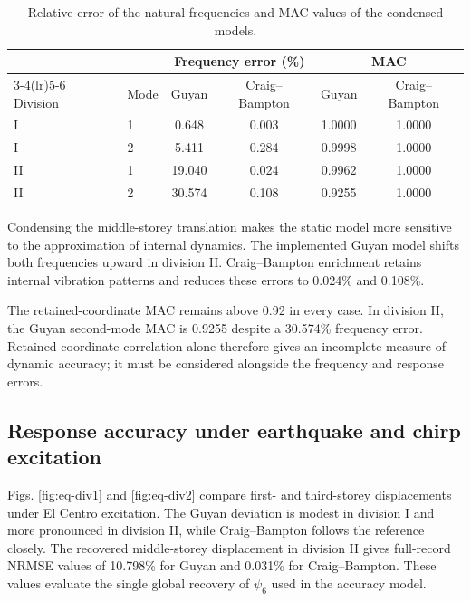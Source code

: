 \documentclass[a4paper,fleqn,review,12pt]{cas-sc}
\numberwithin{equation}{section}
\newcommand{\rev}[1]{{\color{red}#1}}
\begin{document}
\begin{table}[htbp]
	\centering
	\caption{Relative error of the natural frequencies and MAC values of the condensed models.}
	\label{tab:modal}
	\begin{tabular}{llcccc}
		\toprule
		& & \multicolumn{2}{c}{Frequency error (\%)} & \multicolumn{2}{c}{MAC}\\
		\cmidrule(lr){3-4}\cmidrule(lr){5-6}
		Division & Mode & Guyan & Craig--Bampton & Guyan & Craig--Bampton\\
		\midrule
		I  & 1 & 0.648& 0.003& 1.0000& 1.0000\\
		I  & 2 & 5.411& 0.284& 0.9998& 1.0000\\
		\midrule
		II & 1 & \rev{19.040}& \rev{0.024}& 0.9962& 1.0000\\
		II & 2 & \rev{30.574}& \rev{0.108}& 0.9255& \rev{1.0000}\\
		\bottomrule
	\end{tabular}
\end{table}

\rev{Condensing the middle-storey translation makes the static model more sensitive to the approximation of internal dynamics. The implemented Guyan model shifts both frequencies upward in division II. Craig--Bampton enrichment retains internal vibration patterns and reduces these errors to 0.024\% and 0.108\%.}

\rev{The retained-coordinate MAC remains above 0.92 in every case. In division II, the Guyan second-mode MAC is 0.9255 despite a 30.574\% frequency error. Retained-coordinate correlation alone therefore gives an incomplete measure of dynamic accuracy; it must be considered alongside the frequency and response errors.}

\subsection{Response accuracy under earthquake and chirp excitation}
\label{sec:response-accuracy}

\rev{Figs. \ref{fig:eq-div1} and \ref{fig:eq-div2} compare first- and third-storey displacements under El Centro excitation. The Guyan deviation is modest in division I and more pronounced in division II, while Craig--Bampton follows the reference closely. The recovered middle-storey displacement in division II gives full-record NRMSE values of 10.798\% for Guyan and 0.031\% for Craig--Bampton. These values evaluate the single global recovery of \(\psi_6\) used in the accuracy model.}
\end{document}
